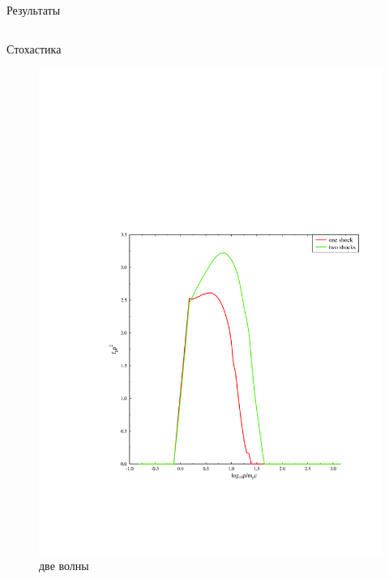\documentclass[8pt,pdf,hyperref={unicode},serif]{beamer}
\begin{document}
\begin{frame}{Результаты}
\begin{columns}
\begin{column}{0.5\textwidth}
Стохастика
\begin{figure}[H]
\centering
\includegraphics[width=0.90\linewidth]{stoh_two_or_one}
\caption{две волны}
\end{figure}
\end{column}
\end{columns}
\end{frame}
\end{document}
